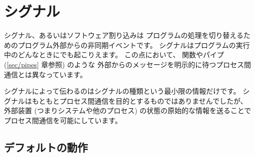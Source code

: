 %
%

\chapter{\label{sec/signals}シグナル}

シグナル、あるいはソフトウェア割り込みは
プログラムの処理を切り替えるためのプログラム外部からの非同期イベントです。
シグナルはプログラムの実行中のどんなときにでも起こりえます。
この点において、  関数やパイプ (\ref{sec/pipes} 章参照) のような
外部からのメッセージを明示的に待つプロセス間通信とは異なっています。

シグナルによって伝わるのはシグナルの種類という最小限の情報だけです。
シグナルはもともとプロセス間通信を目的とするものではありませんでしたが、
外部装置 (つまりシステムや他のプロセス) の状態の原始的な情報を送ることで
プロセス間通信を可能にしています。

\section{デフォルトの動作}

